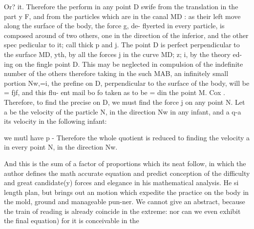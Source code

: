 Or? it. Therefore the perform in any point D swife from the translation in the part y F, and from the particles which are in the canal MD : as their left move along the surface of the body, the force g, de- flyerted in every particle, is composed around of two others, one in the direction of the inferior, and the other spec pedicular to it; call thick p and j. The point D is perfect perpendicular to the surface MD, yth, by all the forces j in the curve MD; z; i, by the theory ed- ing on the fingle point D. This may be neglected in compulsion of the indefinite number of the others therefore taking in the such MAB, an infinitely small portion Nw,=i, the prefine on D, perpendicular to the surface of the body, will be = fjf, and this flu- ent mail bo fo taken as to be = din the point M. Cox . Therefore, to find the precise on D, we must find the force j on any point N. Let a be the velocity of the particle N, in the direction Nw in any infant, and a q-a its velocity in the following infant:\par\medskip
we mutl have p - Therefore the whole quotient is reduced to finding the velocity a in every point N, in the direction Nw.\par\medskip
And this is the sum of a factor of proportions which its neat follow, in which the author defines the math accurate equation and predict conception of the difficulty and great candidate(y) forces and elegance in his mathematical analysis. He si length plan, but brings out an motion which expedite the practice on the body in the mold, ground and manageable pun-ner. We cannot give an abstract, because the train of reading is already coincide in the extreme: nor can we even exhibit the final equation) for it is conceivable in the\par\medskip
